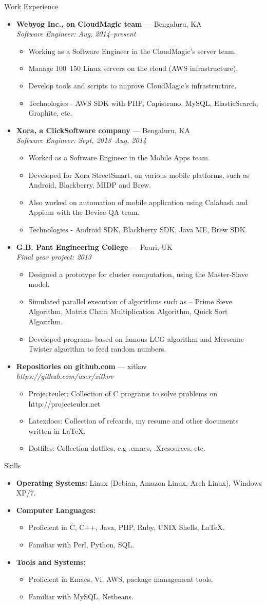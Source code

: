 \documentclass[11pt,oneside]{article}
\newenvironment{ressection}[1]{
  \vspace{4pt}
	     {\fontfamily{phv}\selectfont\Large#1}
	     \begin{itemize}
	       \vspace{3pt}
}{
	     \end{itemize}
}
\newcommand{\resitem}[1]{
  \vspace{-4pt}
\item \begin{flushleft} #1 \end{flushleft}
}
\newcommand{\ressubitem}[1]{
  \vspace{-1pt}
\item \begin{flushleft} #1 \end{flushleft}
}
\newcommand{\resbigitem}[3]{
  \vspace{-5pt}
\item
  \textbf{#1} --- #2 \\
  \textit{#3}
}
\newenvironment{ressubsec}[3]{
  \resbigitem{#1}{#2}{#3}
  \vspace{-2pt}
  \begin{itemize}
}{
  \end{itemize}
}
\newenvironment{reslist}[1]{
  \resitem{\textbf{#1}}
  \vspace{-5pt}
  \begin{itemize}
}{
  \end{itemize}
}
\begin{document}
\begin{ressection}{Work Experience}
  \begin{ressubsec}{Webyog Inc., on CloudMagic team}{Bengaluru, KA}{Software Engineer: Aug, 2014--present}
    \ressubitem{Working as a Software Engineer in the CloudMagic's server team.}
    \ressubitem{Manage 100~150 Linux servers on the cloud (AWS infrastructure).}
    \ressubitem{Develop tools and scripts to improve CloudMagic's infrastructure.}
    \ressubitem{Technologies - AWS SDK with PHP, Capistrano, MySQL, ElasticSearch, Graphite, etc.}
  \end{ressubsec}
  \begin{ressubsec}{Xora, a ClickSoftware company}{Bengaluru, KA}{Software Engineer: Sept, 2013--Aug, 2014}
    \ressubitem{Worked as a Software Engineer in the Mobile Apps team.}
    \ressubitem{Developed for Xora StreetSmart, on various mobile platforms, such as Android, Blackberry, MIDP and Brew.}
    \ressubitem{Also worked on automation of mobile application using Calabash and Appium with the Device QA team.}
    \ressubitem{Technologies - Android SDK, Blackberry SDK, Java ME, Brew SDK.}
  \end{ressubsec}
  \begin{ressubsec}{G.B. Pant Engineering College}{Pauri, UK}{Final year project: 2013}
    \ressubitem{Designed a prototype for cluster computation, using the Master-Slave model.}
    \ressubitem{Simulated parallel execution of algorithms such as -- Prime Sieve Algorithm, Matrix Chain Multiplication Algorithm, Quick Sort Algorithm.}
    \ressubitem{Developed programs based on famous LCG algorithm and Mersenne Twister algorithm to feed random numbers.}
  \end{ressubsec} 
  \begin{ressubsec}{Repositories on github.com}{xitkov}{https://github.com/user/xitkov}
    \ressubitem{Projecteuler: Collection of C programs to solve problems on http://projecteuler.net}
    \ressubitem{Latexdocs:  Collection of refcards, my resume and other documents written in \LaTeX.}
    \ressubitem{Dotfiles: Collection dotfiles, e.g .emacs, .Xresources, etc.}
  \end{ressubsec} 
\end{ressection}

\begin{ressection}{Skills}
  \resitem{\textbf{Operating Systems:} Linux (Debian, Amazon Linux, Arch Linux), Windows XP/7.}
  \begin{reslist}{Computer Languages:}
	\ressubitem{Proficient in C, C++, Java, PHP, Ruby, UNIX Shells, \LaTeX.}
    \ressubitem{Familiar with Perl, Python, SQL.}
  \end{reslist}
  \begin{reslist}{Tools and Systems:}
    \ressubitem{Proficient in Emacs, Vi, AWS, package management tools.}
    \ressubitem{Familiar with MySQL, Netbeans.}
  \end{reslist}
\end{ressection}
\end{document}
